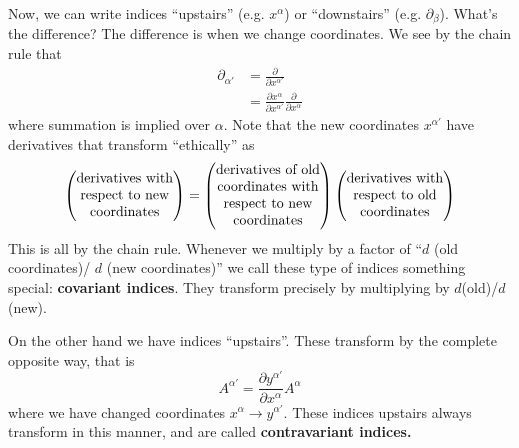 Now, we can write indices ``upstairs'' (e.g. $x^{\alpha}$) or
``downstairs'' (e.g. $\partial_{\beta}$). What's the difference?
The difference is when we change coordinates. We see by the chain
rule that
\begin{subequations}
\begin{align}
\partial_{\alpha'} &= \frac{\partial}{\partial x^{\alpha'}}\\
&= \frac{\partial x^{\alpha}}{\partial
  x^{\alpha'}}\frac{\partial}{\partial x^{\alpha}}
\end{align}
\end{subequations}
where summation is implied over $\alpha$. Note that the new
coordinates $x^{\alpha'}$ have derivatives that transform
``ethically'' as
\begin{equation}%
\begin{pmatrix}
$derivatives$\ $with$\\
$respect$\ $to$\ $new$\\
$coordinates$
\end{pmatrix} =
\begin{pmatrix}
$derivatives$\ $of$\ $old$\\
$coordinates$\ $with$\\
$respect$\ $to$\ $new$\\
$coordinates$
\end{pmatrix}
\begin{pmatrix}
$derivatives$\ $with$\\
$respect$\ $to$\ $old$\\
$coordinates$
\end{pmatrix}
\end{equation}
This is all by the chain rule. Whenever we multiply by a factor
of ``$d$ (old coordinates)/ $d$ (new coordinates)'' we call these
type of indices something special: \textbf{covariant
  indices}. They transform precisely by multiplying by $d$(old)/$d$(new).

On the other hand we have indices ``upstairs''. These transform
by the complete opposite way, that is 
\begin{equation}%
A^{\alpha'}=\frac{\partial y^{\alpha'}}{\partial x^{\alpha}}A^{\alpha}
\end{equation}
where we have changed coordinates $x^{\alpha}\to
y^{\alpha'}$. These indices upstairs always transform in this
manner, and are called \textbf{contravariant indices.}

